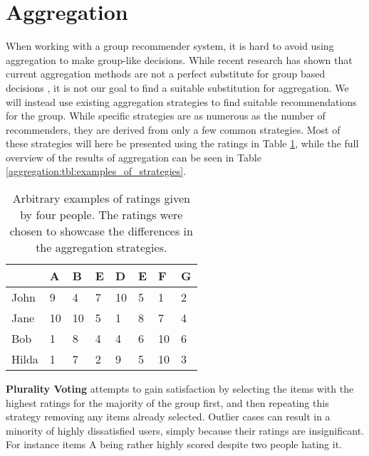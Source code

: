 \section{Aggregation} \label{bg:aggregation} 
When working with a group recommender system, it is hard to avoid using aggregation to make group-like decisions. While recent research has shown that current aggregation methods are not a perfect substitute for group based decisions \cite{aggregationnotenough}, it is not our goal to find a suitable substitution for aggregation. We will instead use existing aggregation strategies to find suitable recommendations for the group. While specific strategies are as numerous as the number of recommenders, they are derived from only a few common strategies. Most of these strategies will here be presented using the ratings in Table \ref{aggregation:tbl:table_of_ratings}, while the full overview of the results of aggregation can be seen in Table \ref{aggregation:tbl:examples_of_strategies}.

\begin{table}[H]
	\centering
	\begin{tabular}{ | p{2cm} | p{1cm} | p{1cm} | p{1cm} | p{1cm} | p{1cm} | p{1cm} | p{1cm} | } \hline
		 & \textbf{A} & \textbf{B} & \textbf{E} & \textbf{D} & \textbf{E} & \textbf{F} & \textbf{G}  \\ \hline
		John & 9 & 4 & 7 & 10 & 5 & 1 & 2 \\ \hline
		Jane & 10 & 10 & 5 & 1 & 8 & 7 & 4 \\ \hline
		Bob & 1 & 8 & 4 & 4 & 6 & 10 & 6 \\ \hline
		Hilda & 1 & 7 & 2 & 9 & 5 & 10 & 3 \\ \hline
	\end{tabular}
	\caption{Arbitrary examples of ratings given by four people. The ratings were chosen to showcase the differences in the aggregation strategies.}
	\label{aggregation:tbl:table_of_ratings}
\end{table}

\textbf{Plurality Voting} attempts to gain satisfaction by selecting the items with the highest ratings for the majority of the group first, and then repeating this strategy removing any items already selected. Outlier cases can result in a minority of highly dissatisfied users, simply because their ratings are insignificant. For instance items A being rather highly scored despite two people hating it.\\

